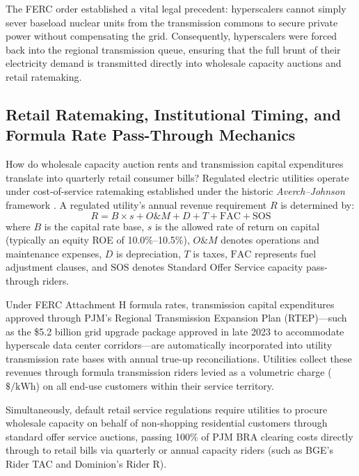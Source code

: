 \documentclass[11pt,a4paper]{article}
\begin{document}
The FERC order established a vital legal precedent: hyperscalers cannot simply sever baseload nuclear units from the transmission commons to secure private power without compensating the grid. Consequently, hyperscalers were forced back into the regional transmission queue, ensuring that the full brunt of their electricity demand is transmitted directly into wholesale capacity auctions and retail ratemaking.

\subsection{Retail Ratemaking, Institutional Timing, and Formula Rate Pass-Through Mechanics}

How do wholesale capacity auction rents and transmission capital expenditures translate into quarterly retail consumer bills? Regulated electric utilities operate under cost-of-service ratemaking established under the historic \emph{Averch--Johnson} framework \citep{averch1962behavior}. A regulated utility's annual revenue requirement $R$ is determined by:
\begin{equation}
    R = B \times s + O\&M + D + T + \text{FAC} + \text{SOS}
\end{equation}
where $B$ is the capital rate base, $s$ is the allowed rate of return on capital (typically an equity ROE of 10.0\%--10.5\%), $O\&M$ denotes operations and maintenance expenses, $D$ is depreciation, $T$ is taxes, $\text{FAC}$ represents fuel adjustment clauses, and $\text{SOS}$ denotes Standard Offer Service capacity pass-through riders.

Under FERC Attachment H formula rates, transmission capital expenditures approved through PJM's Regional Transmission Expansion Plan (RTEP)---such as the \$5.2 billion grid upgrade package approved in late 2023 to accommodate hyperscale data center corridors---are automatically incorporated into utility transmission rate bases with annual true-up reconciliations. Utilities collect these revenues through formula transmission riders levied as a volumetric charge ($\$/\text{kWh}$) on all end-use customers within their service territory.

Simultaneously, default retail service regulations require utilities to procure wholesale capacity on behalf of non-shopping residential customers through standard offer service auctions, passing 100\% of PJM BRA clearing costs directly through to retail bills via quarterly or annual capacity riders (such as BGE's Rider TAC and Dominion's Rider R).
\end{document}
